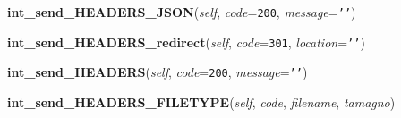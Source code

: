 \hspace{.8\funcindent}\begin{boxedminipage}{\funcwidth}

    \raggedright \textbf{int\_send\_HEADERS\_JSON}(\textit{self}, \textit{code}={\tt 200}, \textit{message}={\tt \texttt{'}\texttt{}\texttt{'}})

\setlength{\parskip}{2ex}
\setlength{\parskip}{1ex}
    \end{boxedminipage}

    \label{Proxy:Proxy:int_send_HEADERS_redirect}

    \vspace{0.5ex}

\hspace{.8\funcindent}\begin{boxedminipage}{\funcwidth}

    \raggedright \textbf{int\_send\_HEADERS\_redirect}(\textit{self}, \textit{code}={\tt 301}, \textit{location}={\tt \texttt{'}\texttt{}\texttt{'}})

\setlength{\parskip}{2ex}
\setlength{\parskip}{1ex}
    \end{boxedminipage}

    \label{Proxy:Proxy:int_send_HEADERS}

    \vspace{0.5ex}

\hspace{.8\funcindent}\begin{boxedminipage}{\funcwidth}

    \raggedright \textbf{int\_send\_HEADERS}(\textit{self}, \textit{code}={\tt 200}, \textit{message}={\tt \texttt{'}\texttt{}\texttt{'}})

\setlength{\parskip}{2ex}
\setlength{\parskip}{1ex}
    \end{boxedminipage}

    \label{Proxy:Proxy:int_send_HEADERS_FILETYPE}

    \vspace{0.5ex}

\hspace{.8\funcindent}\begin{boxedminipage}{\funcwidth}

    \raggedright \textbf{int\_send\_HEADERS\_FILETYPE}(\textit{self}, \textit{code}, \textit{filename}, \textit{tamagno})

\setlength{\parskip}{2ex}
\setlength{\parskip}{1ex}
    \end{boxedminipage}


